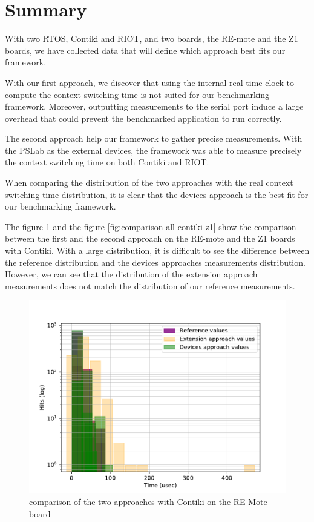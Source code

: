 \section{Summary}

With two RTOS, Contiki and RIOT, and two boards, the RE-mote and the Z1 boards, we have collected data that will define which approach best fits our framework.

With our first approach, we discover that using the internal real-time clock to compute the context switching time is not suited for our benchmarking framework.
Moreover, outputting measurements to the serial port induce a large overhead that could prevent the benchmarked application to run correctly.

The second approach help our framework to gather precise measurements.
With the PSLab as the external devices, the framework was able to measure precisely the context switching time on both Contiki and RIOT.

When comparing the distribution of the two approaches with the real context switching time distribution, it is clear that the devices approach is the best fit for our benchmarking framework.

The figure \ref{fig:comparison-all-contiki-remote} and the figure \ref{fig:comparison-all-contiki-z1} show the comparison between the first and the second approach on the RE-mote and the Z1 boards with Contiki.
With a large distribution, it is difficult to see the difference between the reference distribution and the devices approaches measurements distribution.
However, we can see that the distribution of the extension approach measurements does not match the distribution of our reference measurements.

\begin{figure}[!ht]
  \centering
  \includegraphics[scale=.7]{assets/comparison-all-contiki-remote.pdf}
  \caption{comparison of the two approaches with Contiki on the RE-Mote board\label{fig:comparison-all-contiki-remote}}
\end{figure}

